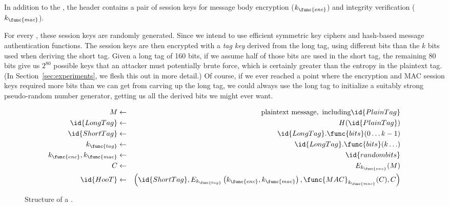 %
In addition to the , the header contains a pair of
session keys
for message body encryption ($k_{\func{enc}}$) and integrity
verification ($k_{\func{mac}}$).

For every \msg, these session keys are randomly generated. Since we
intend to use efficient symmetric key ciphers and hash-based message
authentication functions.
The session keys
are then encrypted with a {\em tag key} derived from the long tag, using
different bits than the $k$ bits used when deriving the
short tag. Given a long tag of 160 bits, if we assume half of those bits
are used in the short tag, the remaining 80 bits give
us $2^{80}$ possible keys that an attacker must potentially brute
force, which is certainly greater than the entropy in the
plaintext tag. (In Section~\ref{sec:experiments}, we flesh this out
in more detail.) Of course, if we ever reached a point where the
encryption and MAC session keys required more
bits than we can get from carving up the long tag, we could always
use the long tag to initialize a suitably strong pseudo-random number
generator, getting us all the derived bits we might ever want.

%

\begin{figure}
\begin{eqnarray*}
M & \leftarrow & \mathrm{plaintext\ message,\ including} \id{PlainTag}
\\
\id{LongTag} & \leftarrow & H(\id{PlainTag}) \\
\id{ShortTag} & \leftarrow & \id{LongTag}.\func{bits}(0 \ldots k-1) \\
k_{\func{tag}} & \leftarrow & \id{LongTag}.\func{bits}(k \ldots) \\
k_{\func{enc}}, k_{\func{mac}} & \leftarrow & \id{random bits} \\
C & \leftarrow & E_{k_{\func{enc}}}(M) \\
\id{HooT}  & \leftarrow &  \left(\id{ShortTag}, E_{k_{\func{tag}}}\left(k_{\func{enc}}, k_{\func{mac}}\right), \func{MAC}_{k_{\func{mac}}}(C), C\right)
\end{eqnarray*}
\caption{Structure of a \msg.\label{fig:hoot-structure}}
\end{figure}
%

